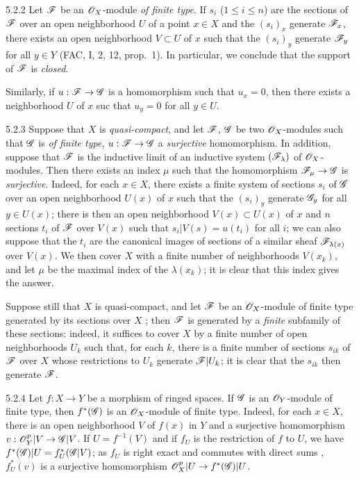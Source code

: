 \begin{env}{5.2.2}
\label{env-0.5.2.2}
Let $\mathscr{F}$ be an $\mathscr{O}_X$-module \emph{of finite type}. If $s_i$ ($1\leqslant i\leqslant n$)
are the sections of $\mathscr{F}$ over an open neighborhood $U$ of a point $x\in X$ and the
$(s_i)_x$ generate $\mathscr{F}_x$, there exists an open neighborhood $V\subset U$ of $x$ such
that the $(s_i)_y$ generate $\mathscr{F}_y$ for all $y\in Y$ (FAC, I, 2, 12, prop.~1). In
particular, we conclude that the support of $\mathscr{F}$ is \emph{closed}.

Similarly, if $u:\mathscr{F}\to\mathscr{G}$ is a homomorphism such that $u_x=0$, then there exists a
neighborhood $U$ of $x$ suc that $u_y=0$ for all $y\in U$.
\end{env}

\begin{env}{5.2.3}
\label{env-0.5.2.3}
Suppose that $X$ is \emph{quasi-compact}, and let $\mathscr{F}$, $\mathscr{G}$ be two $\mathscr{O}_X$-modules
such that $\mathscr{G}$ is \emph{of finite type}, $u:\mathscr{F}\to\mathscr{G}$ a \emph{surjective}
homomorphism. In addition, suppose that $\mathscr{F}$ is the inductive limit of an inductive
system $(\mathscr{F}_\lambda)$ of $\mathscr{O}_X$-modules. Then there exists an index $\mu$ such that the
homomorphism $\mathscr{F}_\mu\to\mathscr{G}$ is \emph{surjective}. Indeed, for each $x\in X$, there
exists a finite system of sections $s_i$ of $\mathscr{G}$ over an open neighborhood $U(x)$ of $x$
such that the $(s_i)_y$ generate $\mathscr{G}_y$ for all $y\in U(x)$; there is then an open
neighborhood $V(x)\subset U(x)$ of $x$ and $n$ sections $t_i$ of $\mathscr{F}$ over $V(x)$ such
that $s_i|V(s)=u(t_i)$ for all $i$; we can also suppose that the $t_i$ are the canonical
images of sections of a similar sheaf $\mathscr{F}_{\lambda(x)}$ over $V(x)$. We then cover $X$
with a finite number of neighborhoods $V(x_k)$, and let $\mu$ be the maximal index of the
$\lambda(x_k)$; it is clear that this index gives the answer.

Suppose still that $X$ is quasi-compact, and let $\mathscr{F}$ be an $\mathscr{O}_X$-module of finite type
generated by its sections over $X$ ; then $\mathscr{F}$ is generated by a
\emph{finite} subfamily of these sections: indeed, it suffices to cover $X$ by a finite
number of open neighborhoods $U_k$ such that, for each $k$, there is a finite number of
sections $s_{ik}$ of $\mathscr{F}$ over $X$ whose restrictions to $U_k$ generate $\mathscr{F}|U_k$; it
is clear that the $s_{ik}$ then generate $\mathscr{F}$.
\end{env}

\begin{env}{5.2.4}
\label{env-0.5.2.4}
Let $f:X\to Y$ be a morphism of ringed spaces. If $\mathscr{G}$ is an $\mathscr{O}_Y$-module of finite
type, then $f^*(\mathscr{G})$ is an $\mathscr{O}_X$-module of finite type. Indeed, for each $x\in X$,
there is an open neighborhood $V$ of $f(x)$ in $Y$ and a surjective homomorphism
$v:\mathscr{O}_Y^p|V\to\mathscr{G}|V$. If $U=f^{-1}(V)$ and if $f_U$ is the restriction of $f$ to $U$, we
have $f^*(\mathscr{G})|U=f_U^*(\mathscr{G}|V)$; as $f_U$ is right exact  and commutes
with direct sums , $f_U^*(v)$ is a surjective homomorphism
$\mathscr{O}_X^p|U\to f^*(\mathscr{G})|U$.
\end{env}

